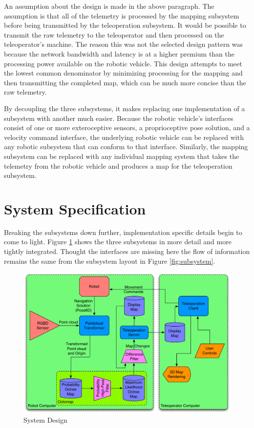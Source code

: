 \documentclass[12pt]{report}
\begin{document}
An assumption about the design is made in the above paragraph.  The assumption is that all of the telemetry is processed by the mapping subsystem before being transmitted by the teleoperation subsystem.  It would be possible to transmit the raw telemetry to the teleoperator and then processed on the teleoperator's machine.  The reason this was not the selected design pattern was because the network bandwidth and latency is at a higher premium than the processing power available on the robotic vehicle.  This design attempts to meet the lowest common denominator by minimizing processing for the mapping and then transmitting the completed map, which can be much more concise than the raw telemetry.

By decoupling the three subsystems, it makes replacing one implementation of a subsystem with another much easier.  Because the robotic vehicle's interfaces consist of one or more exteroceptive sensors, a proprioceptive pose solution, and a velocity command interface, the underlying robotic vehicle can be replaced with any robotic subsystem that can conform to that interface.  Similarly, the mapping subsystem can be replaced with any individual mapping system that takes the telemetry from the robotic vehicle and produces a map for the teleoperation subsystem.

\section{System Specification}
Breaking the subsystems down further, implementation specific details begin to come to light.  Figure \ref{fig:system_diagram} shows the three subsystems in more detail and more tightly integrated.  Thought the interfaces are missing here the flow of information remains the same from the subsystem layout in Figure \ref{fig:subsystem}.

\begin{figure}[ht]
  \centering
  \includegraphics[width=6in,keepaspectratio]{system_diagram.pdf}
  \caption{System Design}
  \label{fig:system_diagram}
\end{figure}
\end{document}
